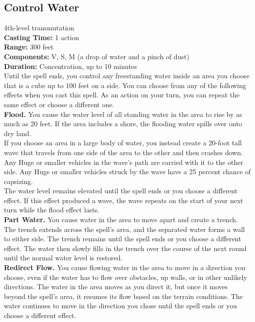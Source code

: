 \documentclass[11pt, A4paper, english]{article}
\begin{document}
		\subsection{Control Water}
4th-level transmutation \\
\textbf{Casting Time:} 1 action \\
\textbf{Range:} 300 feet \\
\textbf{Components:} V, S, M (a drop of water and a pinch of dust) \\
\textbf{Duration:} Concentration, up to 10 minutes \\
Until the spell ends, you control any freestanding water inside an area you choose that is a cube up to 100 feet on a side. You can choose from any of the following effects when you cast this spell. As an action on your turn, you can repeat the same effect or choose a different one. \\
\textbf{Flood.} You cause the water level of all standing water in the area to rise by as much as 20 feet. If the area includes a shore, the flooding water spills over onto dry land. \\
If you choose an area in a large body of water, you instead create a 20-foot tall wave that travels from one side of the area to the other and then crashes down. Any Huge or smaller vehicles in the wave’s path are carried with it to the other side. Any Huge or smaller vehicles struck by the wave have a 25 percent chance of capsizing. \\
The water level remains elevated until the spell ends or you choose a different effect. If this effect produced a wave, the wave repeats on the start of your next turn while the flood effect lasts. \\
\textbf{Part Water.} You cause water in the area to move apart and create a trench. The trench extends across the spell’s area, and the separated water forms a wall to either side. The trench remains until the spell ends or you choose a different effect. The water then slowly fills in the trench over the course of the next round until the normal water level is restored. \\
\textbf{Redirect Flow.} You cause flowing water in the area to move in a direction you choose, even if the water has to flow over obstacles, up walls, or in other unlikely directions. The water in the area moves as you direct it, but once it moves beyond the spell’s area, it resumes its flow based on the terrain conditions. The water continues to move in the direction you chose until the spell ends or you choose a different effect. \\
\end{document}
